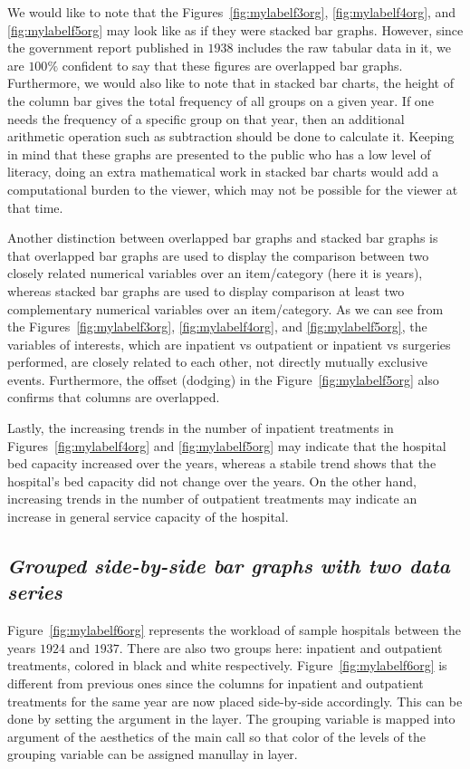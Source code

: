 We would like to note that the Figures~\ref{fig:mylabelf3org}, \ref{fig:mylabelf4org}, and \ref{fig:mylabelf5org} may look like as if they were stacked bar graphs. However, since the government report published in $1938$ includes the raw tabular data in it, we are $100\%$ confident to say that these figures are overlapped bar graphs. Furthermore, we would also like to note that in stacked bar charts, the height of the column bar gives the total frequency of all groups on a given year. If one needs the frequency of a specific group on that year, then an additional arithmetic operation such as subtraction should be done to calculate it. Keeping in mind that these graphs are presented to the public who has a low level of literacy, doing an extra mathematical work in stacked bar charts would add a computational burden to the viewer, which may not be possible for the viewer at that time.

Another distinction between overlapped bar graphs and stacked bar graphs is that overlapped bar graphs are used to display the comparison between two closely related numerical variables over an item/category (here it is years), whereas stacked bar graphs are used to display comparison at least two complementary numerical variables over an item/category. As we can see from the Figures~\ref{fig:mylabelf3org}, \ref{fig:mylabelf4org}, and \ref{fig:mylabelf5org}, the variables of interests, which are inpatient vs outpatient or inpatient vs surgeries performed, are closely related to each other, not directly mutually exclusive events. Furthermore, the offset (dodging) in the Figure~\ref{fig:mylabelf5org} also confirms that columns are overlapped.

Lastly, the increasing trends in the number of inpatient treatments  in Figures~\ref{fig:mylabelf4org} and \ref{fig:mylabelf5org} may indicate that the hospital bed capacity increased over the years, whereas a stabile trend shows that the hospital's bed capacity did not change over the years. On the other hand, increasing trends in the number of outpatient treatments may indicate an increase in general service capacity of the hospital.

\subsection{\textit{Grouped side-by-side bar graphs with two data series}}

Figure~\ref{fig:mylabelf6org} represents the workload of sample hospitals between the years $1924$ and $1937$. There are also two groups here: inpatient and outpatient treatments, colored in black and white respectively. Figure~\ref{fig:mylabelf6org} is different from previous ones since the columns for inpatient and outpatient treatments for the same year are now placed side-by-side accordingly. This can be done by setting the argument  in the  layer.  The grouping variable is mapped into  argument of the aesthetics of the main  call so that color of the levels of the grouping variable can be assigned manullay  in  layer.

